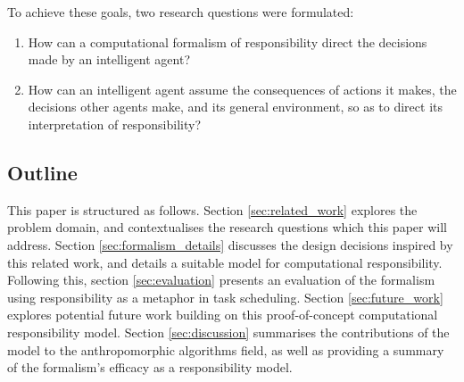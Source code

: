 To achieve these goals, two research questions were formulated:

\begin{enumerate}\label{RQ}
    \item How can a computational formalism of responsibility direct the decisions made by an intelligent agent?
    \item How can an intelligent agent assume the consequences of actions it makes, the decisions other agents make, and its general environment, so as to direct its interpretation of responsibility?
\end{enumerate}\par

\subsection{Outline}

This paper is structured as follows. Section \ref{sec:related_work} explores the problem domain, and contextualises the research questions which this paper will address. Section \ref{sec:formalism_details} discusses the design decisions inspired by this related work, and details a suitable model for computational responsibility. Following this, section \ref{sec:evaluation} presents an evaluation of the formalism using responsibility as a metaphor in task scheduling.  Section \ref{sec:future_work} explores potential future work building on this proof-of-concept computational responsibility model. Section \ref{sec:discussion} summarises the contributions of the model to the anthropomorphic algorithms field, as well as providing a summary of the formalism's efficacy as a responsibility model.\par
% 
% 
% 
% 

